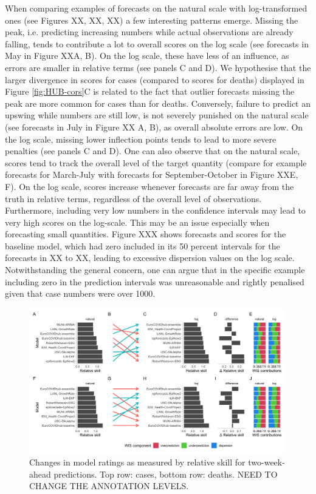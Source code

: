\documentclass{article}
\begin{document}
When comparing examples of forecasts on the natural scale with log-transformed ones (see Figures XX, XX, XX) a few interesting patterns emerge. Missing the peak, i.e. predicting increasing numbers while actual observations are already falling, tends to contribute a lot to overall scores on the log scale (see forecasts in May in Figure XXA, B). On the log scale, these have less of an influence, as errors are smaller in relative terms (see panels C and D). We hypothesise that the larger divergence in scores for cases (compared to scores for deaths) displayed in Figure \ref{fig:HUB-cors}C is related to the fact that outlier forecasts missing the peak are more common for cases than for deaths. 
Conversely, failure to predict an upswing while numbers are still low, is not severely punished on the natural scale (see forecasts in July in Figure XX A, B), as overall absolute errors are low. On the log scale, missing lower inflection points tends to lead to more severe penalties (see panels C and D). One can also observe that on the natural scale, scores tend to track the overall level of the target quantity (compare for example forecasts for March-July with forecasts for September-October in Figure XXE, F). On the log scale, scores increase whenever forecasts are far away from the truth in relative terms, regardless of the overall level of observations. Furthermore, including very low numbers in the confidence intervals may lead to very high scores on the log-scale. This may be an issue especially when forecasting small quantities. Figure XXX shows forecasts and scores for the baseline model, which had zero included in its 50 percent intervals for the forecasts in XX to XX, leading to excessive dispersion values on the log scale. Notwithstanding the general concern, one can argue that in the specific example including zero in the prediction intervals was unreasonable and rightly penalised given that case numbers were over 1000. 

\begin{figure}[h!]
    \centering
    \includegraphics[width=0.99\textwidth]{output/figures/HUB-pairwise-comparisons.png}
    \caption{Changes in model ratings as measured by relative skill for two-week-ahead predictions. Top row: cases, bottom row: deaths. NEED TO CHANGE THE ANNOTATION LEVELS.}
    \label{fig:HUB-pairwise}
\end{figure}
\end{document}
